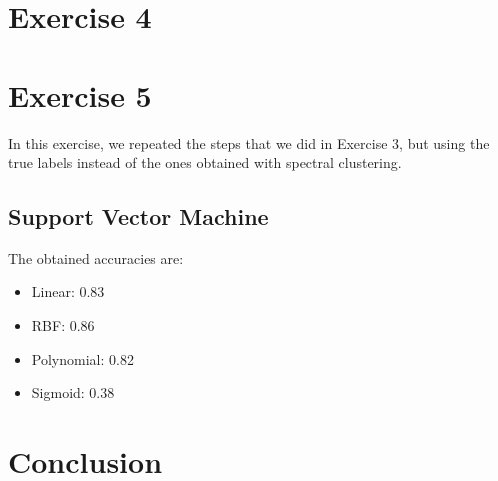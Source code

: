 \documentclass[12pt]{article}
\begin{document}
\section{Exercise 4}

\section{Exercise 5}
In this exercise, we repeated the steps that we did in Exercise 3, but using the true labels instead of the ones obtained with spectral clustering.
	\subsection{Support Vector Machine}
	The obtained accuracies are:
	\begin{itemize}
		\item Linear: 0.83
		\item RBF: 0.86
		\item Polynomial: 0.82
		\item Sigmoid: 0.38
	\end{itemize}

\section{Conclusion}

% 
% 
\end{document}
